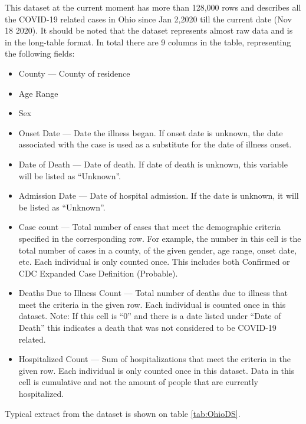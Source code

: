 \documentclass[conference]{IEEEtran}
\begin{document}
	This dataset at the current moment has more
        than 128,000 rows and describes all the COVID-19 related cases in Ohio since Jan 2,2020 till the current date (Nov 18 2020). It should be noted that the dataset represents almost raw data and is in the long-table format. In total there are 9 columns in the table, representing the following fields:
        \begin{itemize}
        \item County --- County of residence
        \item Age Range
         \item Sex
        \item Onset Date --- Date the illness began. If onset date is unknown, the date associated with the case is used as a substitute for the date of illness onset.
        \item Date of Death --- Date of death. If date of death is unknown, this variable will be listed as “Unknown”.
        \item Admission Date --- Date of hospital admission. If the date is unknown, it will be listed as “Unknown”.
        \item Case count --- Total number of cases that meet the demographic criteria specified in the corresponding row. For example, the number in this cell is the total number of cases in a county, of the given gender, age range, onset date, etc. Each individual is only counted once. This includes both Confirmed or CDC Expanded Case Definition (Probable).
        \item Deaths Due to Illness Count --- Total number of deaths due to illness that meet the criteria in the given row. Each individual is counted once in this dataset. Note: If this cell is “0” and there is a date listed under “Date of Death” this indicates a death that was not considered to be COVID-19 related.
        \item Hospitalized Count --- Sum of hospitalizations that meet the criteria in the given row. Each individual is only counted once in this dataset. Data in this cell is cumulative and not the amount of people that are currently hospitalized.
        \end{itemize}
Typical extract from the dataset is shown on table \ref{tab:OhioDS}.
\end{document}
